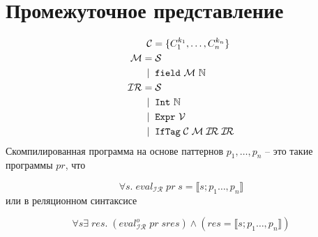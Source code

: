 \documentclass[a5paper,12pt]{article}
\newcommand{\sem}[1]{\llbracket #1 \rrbracket}
\begin{document}
\section{Промежуточное представление}
\begin{align*}
\mathcal{C} &= \{ C_1^{k_1}, \dots, C_n^{k_n} \} \\
\mathcal{M} =&\;  \mathcal{S} \\
          \mid\; &\; \text{\texttt{field}}\  \mathcal{M}\  \mathbb{N}\\
\mathcal{IR} =&\; \mathcal{S} \\
           \mid\; &\;\text{\texttt{Int}}\  \mathbb{N} \\
           \mid\; &\;\text{\texttt{Expr}}\  \mathcal{V} \\
           \mid\; &\; \text{\texttt{IfTag}}\; \mathcal{C}\; \mathcal{M}\; \mathcal{I\!R}\; \mathcal{I\!R}
\end{align*}
Скомпилированная программа на основе паттернов $p_1,\dots,p_n$ -- это 
такие программы $pr$, что 

$$
\forall s.\; eval_{\mathcal{I\!R}}\; pr\; s = \sem{s;p_1\dots,p_n} 
$$
или в реляционном синтаксисе

$$
\forall s \exists\; res.\; (eval^o_{\mathcal{I\!R}}\; pr\; s res) \land ( res = \sem{s;p_1\dots,p_n}) 
$$
\end{document}
